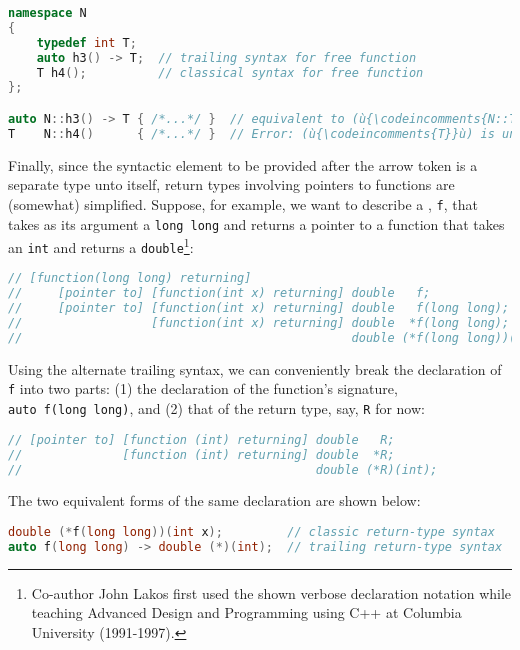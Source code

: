 \begin{lstlisting}[language=C++]
namespace N
{
    typedef int T;
    auto h3() -> T;  // trailing syntax for free function
    T h4();          // classical syntax for free function
};

auto N::h3() -> T { /*...*/ }  // equivalent to (ù{\codeincomments{N::T N::h3() \{ /\*...\*/ \}}}ù)
T    N::h4()      { /*...*/ }  // Error: (ù{\codeincomments{T}}ù) is unknown in this context.
\end{lstlisting}


Finally, since the syntactic element to be provided after the arrow
token is a separate type unto itself, return types involving pointers to
functions are (somewhat) simplified. Suppose, for example, we want to
describe a , \lstinline!f!, that takes as its
argument a \lstinline!long!~\lstinline!long! and returns a pointer to a
function that takes an \lstinline!int! and returns a
\lstinline!double!{\cprotect\footnote{Co-author John Lakos first used the shown verbose declaration notation
while teaching Advanced Design and Programming using C++ at Columbia
  University (1991-1997).}}:

\begin{lstlisting}[language=C++]
// [function(long long) returning]
//     [pointer to] [function(int x) returning] double   f;
//     [pointer to] [function(int x) returning] double   f(long long);
//                  [function(int x) returning] double  *f(long long);
//                                              double (*f(long long))(int x);
\end{lstlisting}

\noindent Using the alternate trailing syntax, we can conveniently break the
declaration of \lstinline!f! into two parts: (1) the declaration of the
function's signature, \lstinline!auto!~\lstinline!f(long!~\lstinline!long)!, and (2) that of the return type, say, \lstinline!R! for now:

\begin{lstlisting}[language=C++]
// [pointer to] [function (int) returning] double   R;
//              [function (int) returning] double  *R;
//                                         double (*R)(int);
\end{lstlisting}

\noindent The two equivalent forms of the same declaration are shown below:

\begin{lstlisting}[language=C++]
double (*f(long long))(int x);         // classic return-type syntax
auto f(long long) -> double (*)(int);  // trailing return-type syntax
\end{lstlisting}

